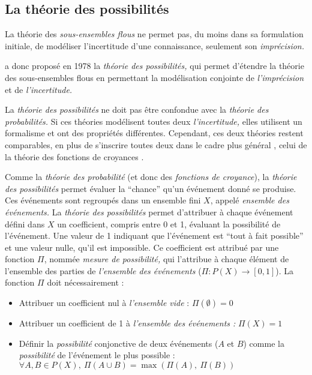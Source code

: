 

\subsection{La théorie des possibilités}


La théorie des \emph{sous-ensembles flous} ne permet pas, du moins
dans sa formulation initiale, de modéliser l'incertitude d'une
connaissance, seulement son \emph{imprécision.}

\textcite{Zadeh1978} a donc proposé en 1978 la \emph{théorie des
  possibilités,} qui permet d'étendre la théorie des sous-ensembles
flous en permettant la modélisation conjointe de \emph{l'imprécision}
et de \emph{l'incertitude.}

La \emph{théorie des possibilités} ne doit pas être confondue avec la
\emph{théorie des probabilités.} Si ces théories modélisent toutes
deux \emph{l'incertitude,} elles utilisent un formalisme et ont des
propriétés différentes. Cependant, ces deux théories restent
comparables, en plus de s’inscrire toutes deux dans le cadre plus
général \autocite{Bouchon-Meunier1995}, celui de la théorie des
fonctions de croyances \autocite{Shafer1976}.

Comme la \emph{théorie des probabilité} (et donc des \emph{fonctions
  de croyance}), la \emph{théorie des possibilités} permet évaluer la
\enquote{chance} qu'un événement donné se produise. Ces événements
sont regroupés dans un ensemble fini \(X\), appelé \emph{ensemble des
  événements.} La \emph{théorie des possibilités} permet d'attribuer à
chaque événement défini dans \(X\) un coefficient, compris entre 0 et
1, évaluant la possibilité de l'événement. Une valeur de 1 indiquant
que l'événement est \enquote{tout à fait possible}
\autocite[p. 43]{Bouchon-Meunier2007} et une valeur nulle, qu'il est
impossible. Ce coefficient est attribué par une fonction \(Π\), nommée
\emph{mesure de possibilité,} qui l'attribue à chaque élément de
l'ensemble des parties de \emph{l'ensemble des événements}
(\(Π : P(X) → [0,1]\)). La fonction \(Π\) doit nécessairement :

\begin{itemize}
\item Attribuer un coefficient nul à \emph{l'ensemble vide} :
  \(Π(∅)=0\)
\item Attribuer un coefficient de 1 à \emph{l'ensemble des événements
    :} \(Π(X)=1\)
\item Définir la \emph{possibilité} conjonctive de deux événements
  (\(A\) et \(B\)) comme la \emph{possibilité} de l'événement le plus
  possible : \(∀ A,B ∈ P(X),\ Π(A ∪ B) = \max(Π(A),\ Π(B))\)
\end{itemize}

